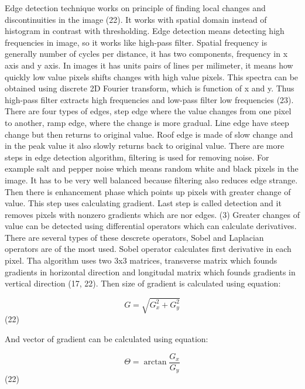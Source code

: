 \documentclass[a4paper,12pt]{article}   %
\numberwithin{equation}{section}        %
\begin{document}
        Edge detection technique works on principle of finding local changes and discontinuities in the image (22). It works with spatial domain instead of histogram in contrast with thresholding.
        Edge detection means detecting high frequencies in image, so it works like high-pass filter. Spatial frequency is generally number of cycles per distance, it has two components,
        frequency in x axis and y axis. In images it has units pairs of lines per milimeter, it means how quickly low value pixels shifts changes with high value pixels.
        This spectra can be obtained using discrete 2D Fourier transform, which is function of x and y. Thus high-pass filter extracts high frequencies and low-pass filter low frequencies (23).
        There are four types of edges, step edge where the value changes from one pixel to another, ramp edge, where the change is more gradual. Line edge have steep change
        but then returns to original value. Roof edge is made of slow change and in the peak value it also slowly returns back to original value.
        There are more steps in edge detection algorithm, filtering is used for removing noise. For example salt and pepper noise
        which means random white and black pixels in the image. It has to be very well balanced because filtering also reduces edge strange.
        Then there is enhancement phase which points up pixels with greater change of value. This step uses calculating gradient. Last step is called detection
        and it removes pixels with nonzero gradients which are nor edges. (3) Greater changes of value can be detected using differential operators which can calculate derivatives.
        There are several types of these descrete operators, Sobel and Laplacian operators are of the most used. Sobel operator calculates first derivative in each pixel.
        Tha algorithm uses two 3x3 matrices, transverse matrix which founds gradients in horizontal direction and longitudal matrix which founds gradients in vertical direction (17, 22).
        Then size of gradient is calculated using equation:

        \begin{equation}
            G = \sqrt{G_x^2 + G_y^2}
        \end{equation}
        (22)
        
        And vector of gradient can be calculated using equation:

        \begin{equation}
            \Theta = \arctan{\frac{G_x}{G_y}}
        \end{equation}
        (22)
\end{document}
